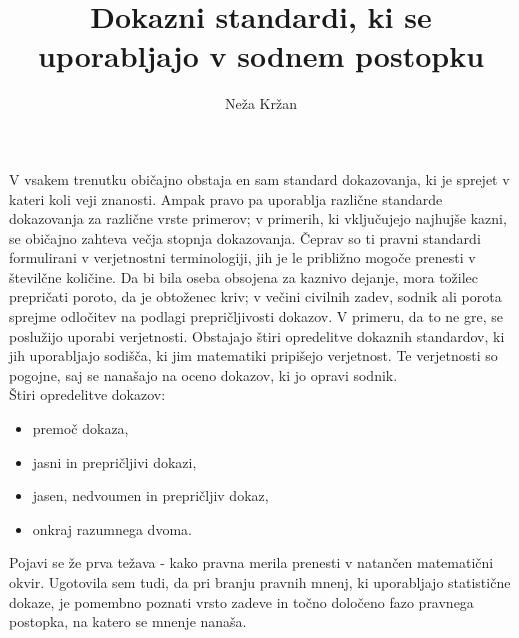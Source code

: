 \documentclass[12pt,a4paper]{amsart}
\theoremstyle{definition} %
\theoremstyle{plain} %
\begin{document}
\title{Dokazni standardi, ki se uporabljajo v sodnem postopku}
\author{Neža Kržan}
\maketitle

V vsakem trenutku običajno obstaja en sam standard dokazovanja, ki je sprejet v kateri koli veji znanosti. Ampak pravo pa uporablja različne 
standarde dokazovanja za različne vrste primerov; v primerih, ki vključujejo najhujše kazni, se običajno zahteva večja stopnja dokazovanja. Čeprav 
so ti pravni standardi formulirani v verjetnostni terminologiji, jih je le približno mogoče prenesti v številčne količine. 
Da bi bila oseba obsojena za kaznivo dejanje, mora tožilec prepričati poroto, da je obtoženec kriv; v večini civilnih zadev, sodnik ali 
porota sprejme odločitev na podlagi prepričljivosti dokazov. V primeru, da to ne gre, se poslužijo uporabi verjetnosti. Obstajajo štiri opredelitve 
dokaznih standardov, ki jih uporabljajo sodišča, ki jim matematiki pripišejo verjetnost. Te verjetnosti so pogojne, saj se nanašajo na oceno dokazov, 
ki jo opravi sodnik.\\
Štiri opredelitve dokazov:
\begin{itemize}
    \item premoč dokaza,
    \item jasni in prepričljivi dokazi,
    \item jasen, nedvoumen in prepričljiv dokaz,
    \item onkraj razumnega dvoma.
\end{itemize}
Pojavi se že prva težava - kako pravna merila prenesti v natančen matematični okvir. Ugotovila sem tudi, da pri branju pravnih mnenj, ki uporabljajo 
statistične dokaze, je pomembno poznati vrsto zadeve in točno določeno fazo pravnega postopka, na katero se mnenje nanaša.

\end{document}
